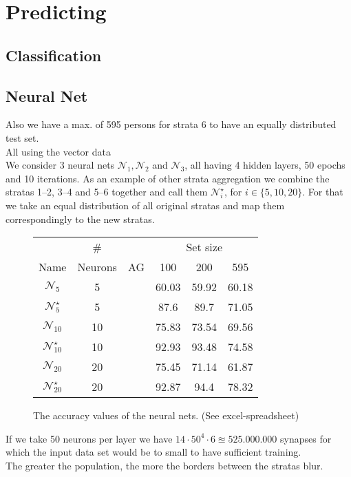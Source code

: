 \documentclass[runningheads]{llncs}
\newcommand{\cmark}{\ding{51}}%
\newcommand{\xmark}{\ding{55}}%
\begin{document}
	\section{Predicting}
	
	\subsection{Classification}
	\subsection{Neural Net}
	Also we have a max. of 595 persons for strata 6 to have an equally distributed test set.\\	
	All using the vector data\\
	
	We consider 3 neural nets $\mathcal{N}_1,\mathcal{N}_2$ and $\mathcal{N}_3$, all having 4 hidden layers, 50 epochs and 10 iterations.	
	As an example of other strata aggregation we combine the stratas 1--2, 3--4 and 5--6 together and call them $\mathcal{N}_i^\star$, for $i \in \{5,10,20\}$. For that we take an equal distribution of all original stratas and map them correspondingly to the new stratas. 	
	\setlength\tabcolsep{.2cm}
	\begin{figure}[H]
	\centering
	\begin{tabular}{|c|c|c|c|c|c|}
		\hline
		                         &   \#    &        & \multicolumn{3}{c|}{Set size} \\
		          Name           & Neurons &   AG   &  100  &  200  &      595      \\ \hline
		    $\mathcal{N}_5$      &    5    & \xmark & 60.03 & 59.92 &     60.18     \\
		 $\mathcal{N}_5^\star$   &    5    & \cmark & 87.6  & 89.7  &     71.05     \\
		   $\mathcal{N}_{10}$    &   10    & \xmark & 75.83 & 73.54 &     69.56     \\
		$\mathcal{N}_{10}^\star$ &   10    & \cmark & 92.93 & 93.48 &     74.58     \\		
		   $\mathcal{N}_{20}$    &   20    & \xmark & 75.45 & 71.14 &     61.87     \\
		$\mathcal{N}_{20}^\star$ &   20    & \cmark & 92.87 & 94.4  &     78.32     \\ \hline
	\end{tabular}
	\caption{The accuracy values of the neural nets. (See excel-spreadsheet)}
	\label{tab: nn-accuracy}
	\end{figure}


If we take 50 neurons per layer we have $14 \cdot 50^4 \cdot 6 \approxeq 525.000.000$ synapses for which the input data set would be to small to have sufficient training.\\

The greater the population, the more the borders between the stratas blur. 

	
	
\end{document}
